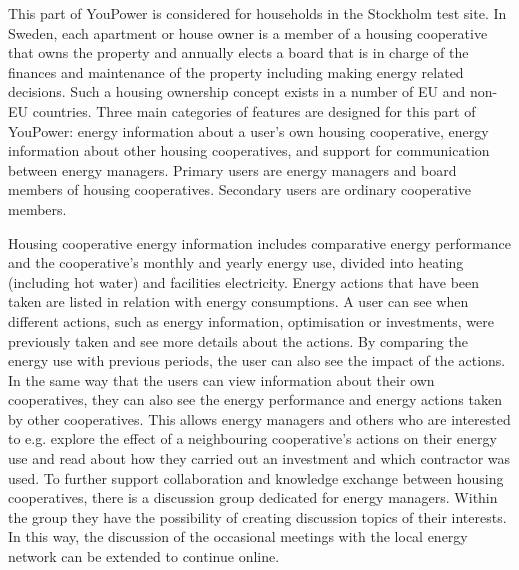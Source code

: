 This part of YouPower is considered for households in the Stockholm test site. In Sweden, each apartment or house owner is a member of a housing cooperative that owns the property and annually elects a board that is in charge of the finances and maintenance of the property including making energy related decisions. 
Such a housing ownership concept exists in a number of EU and non-EU countries.
% 
Three main categories of features are designed for this part of YouPower: energy information about a user's own housing cooperative, energy information about other housing cooperatives, and support for communication between energy managers.
Primary users are energy managers and board members of housing cooperatives. Secondary users are ordinary cooperative members. 

Housing cooperative energy information includes comparative energy performance %
and the cooperative's monthly and yearly energy use, divided into heating (including hot water) and facilities electricity. Energy actions that have been taken are listed in relation with energy consumptions. 
A user can see when different actions, such as energy information, optimisation or investments, were previously taken and see more details about the actions. By comparing the energy use with previous periods, the user can also see the impact of the actions.
% 
In the same way that the users can view information about their own cooperatives, they can also see the energy performance and energy actions taken by other cooperatives. This allows energy managers and others who are interested to e.g. explore the effect of a neighbouring cooperative's actions on their energy use and read about how they carried out an investment and which contractor was used. 
% 
To further support collaboration and knowledge exchange between housing cooperatives, there is a discussion group dedicated for energy managers. Within the group they have the possibility of creating discussion topics of their interests. In this way, the discussion of the occasional meetings with the local energy network can be extended to continue online.

